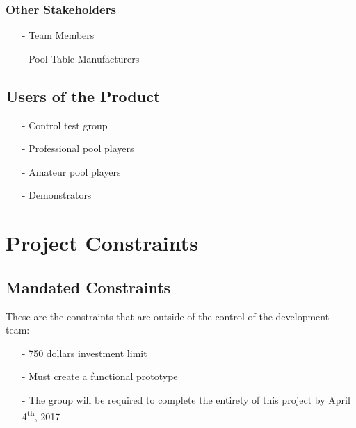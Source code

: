 \documentclass[titlepage]{article}
\begin{document}
\subsubsection{Other Stakeholders}
\begin{itemize}
	\item[-] Team Members
	\item[-] Pool Table Manufacturers
\end{itemize}

\subsection{Users of the Product}
\begin{itemize}
	\item[-] Control test group
	\item[-] Professional pool players
	\item[-] Amateur pool players
	\item[-] Demonstrators
\end{itemize}


\section{Project Constraints}
\subsection{Mandated Constraints}
These are the constraints that are outside of the control of the development team:
\begin{itemize}
	\item[-] 750 dollars investment limit
	\item[-] Must create a functional prototype
	\item[-] The group will be required to complete the entirety of this project by April 4\textsuperscript{th}, 2017
\end{itemize}
\end{document}
